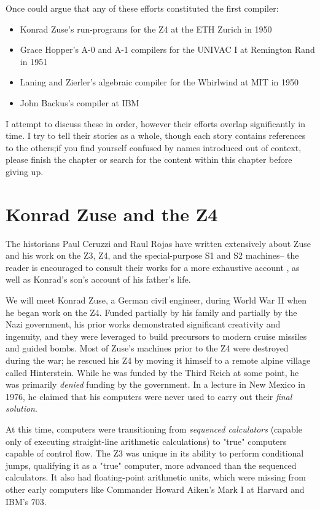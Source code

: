 \bigskip
Once could argue that any of these efforts constituted the first compiler:
\begin{itemize}
	\item Konrad Zuse's run-programs for the Z4 at the ETH Zurich in 1950
	\item Grace Hopper's A-0 and A-1 compilers for the UNIVAC I at
	      Remington Rand in 1951
	\item Laning and Zierler's algebraic compiler for the Whirlwind at MIT in 1950
	\item John Backus's \FTNI{} compiler at IBM
\end{itemize}

I attempt to discuss these in order, however their efforts overlap
significantly in time. I try to tell their stories as a whole, though each story
contains references to the others;if you find yourself confused by names
introduced out of context, please finish the chapter or search for the content
within this chapter before giving up.

\section{Konrad Zuse and the Z4}

The historians Paul Ceruzzi and Raul Rojas have written extensively about
Zuse and his work on the Z3, Z4, and the special-purpose S1 and S2 machines--
the reader is encouraged to consult their works for a more exhaustive account
\cite{ceruzzi_early_computers_of_zuse_1981}
\cite{rojas_arch_of_zuses_machines_2000},
as well as Konrad's son's account of his father's life\cite{zuse2009life}.

We will meet Konrad Zuse, a German civil engineer, during World War II when
he began work on the Z4.
Funded partially by his family and partially by the Nazi government, his
prior works demonstrated significant creativity and ingenuity, and they were
leveraged to build precursors to modern cruise missiles and guided bombs. Most of
Zuse's machines prior to the Z4 were destroyed during the war;
he rescued his Z4 by moving it himself to a remote alpine village
called Hinterstein\cite{Knuth_TrabbPardo_1976_Early_Development}.
While he was funded by the Third Reich at some point, he was primarily \textit{denied}
funding by the government. In a lecture in New Mexico in 1976, he claimed
that his computers were never used to carry out their \textit{final solution}.

At this time, computers were transitioning from \textit{sequenced calculators}
(capable only of executing straight-line arithmetic calculations)
to "true" computers capable of control flow.
The Z3 was unique in its ability to perform conditional jumps, qualifying it
as a "true" computer, more advanced than the sequenced calculators.
It also had floating-point arithmetic units, which were missing from other
early computers like Commander Howard Aiken's Mark I at Harvard and IBM's 703.

